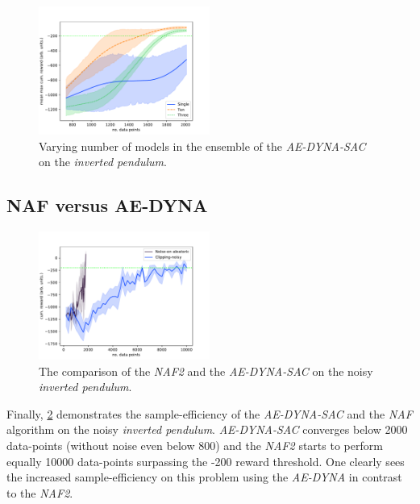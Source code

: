 \documentclass[
reprint,
amsmath,amssymb,amsfonts,clevref,
aps,
prstab,
]{revtex4-2}
\begin{document}
	\begin{figure}[h]
		\centering
		\includegraphics*[width=0.5\textwidth]{Figures/Comparison_models_sizes}
		\caption{Varying number of models in the ensemble of the \emph{AE-DYNA-SAC} on the \emph{inverted pendulum}.}
		\label{fig:Compare_models_sizes}
	\end{figure}
	\subsection{NAF versus AE-DYNA}
		\begin{figure}[h]
		\centering
		\includegraphics*[width=0.5\textwidth]{Figures/Comparison_NAF_AE-DYNA}
		\caption{The comparison of the \emph{NAF2} and the \emph{AE-DYNA-SAC} on the noisy \emph{inverted pendulum}.}
		\label{fig:comparsion_NAF_AE-DYNA}
	\end{figure}
	
	Finally, \cref{fig:comparsion_NAF_AE-DYNA} demonstrates the sample-efficiency of the \emph{AE-DYNA-SAC} and the \emph{NAF} algorithm on the noisy \emph{inverted pendulum}. \emph{AE-DYNA-SAC} converges below 2000 data-points (without noise even below 800) and the \emph{NAF2} starts to perform equally 10000 data-points surpassing the -200 reward threshold. One clearly sees the increased sample-efficiency on this problem using the \emph{AE-DYNA} in contrast to the \emph{NAF2}.

	
	
\end{document}
